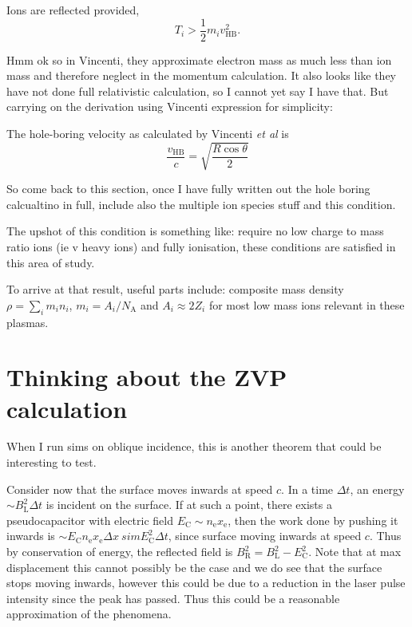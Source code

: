 Ions are reflected provided,
\begin{equation}
	T_i > \frac{1}{2}m_iv^2_\mathrm{HB}.
\end{equation}

Hmm ok so in Vincenti, they approximate electron mass as much less than ion mass and therefore neglect in the momentum calculation. It also looks like they have not done full relativistic calculation, so I cannot yet say I have that. But carrying on the derivation using Vincenti expression for simplicity:

The hole-boring velocity as calculated by Vincenti \textit{et al} \cite{vincentiOpticalPropertiesRelativistic2014} is
\begin{equation}
	\frac{v_\mathrm{HB} }{c}= \sqrt{\frac{R\cos\theta}{2}}
\end{equation}

So come back to this section, once I have fully written out the hole boring calcualtino in full, include also the multiple ion species stuff and this condition.

The upshot of this condition is something like: require no low charge to mass ratio ions (ie v heavy ions) and fully ionisation, these conditions are satisfied in this area of study.

To arrive at that result, useful parts include:
composite mass density $\rho = \sum_i m_i n_i$, $m_i = A_i/N_\mathrm{A}$ and $A_i \approx 2Z_i$ for most low mass ions relevant in these plasmas.




\section{Thinking about the ZVP calculation}
When I run sims on oblique incidence, this is another theorem that could be interesting to test.

Consider now that the surface moves inwards at speed $c$. In a time $\Delta t$, an energy $\sim B_\mathrm{L}^2\Delta t$ is incident on the surface. If at such a point, there exists a pseudocapacitor with electric field $E_\mathrm{C} \sim n_\mathrm{e}x_\mathrm{e}$, then the work done by pushing it inwards is $\sim E_\mathrm{C} n_\mathrm{e}x_\mathrm{e} \Delta x \ sim E_\mathrm{C}^2\Delta t$, since surface moving inwards at speed $c$. Thus by conservation of energy, the reflected field is $B_\mathrm{R}^2 = B_\mathrm{L}^2 - E_\mathrm{C}^2$. Note that at max displacement this cannot possibly be the case and we do see that the surface stops moving inwards, however this could be due to a reduction in the laser pulse intensity since the peak has passed. Thus this could be a reasonable approximation of the phenomena.

